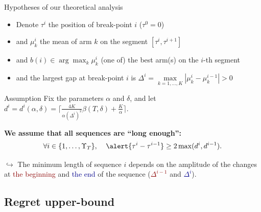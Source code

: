 \documentclass[11pt,french,ignorenonframetext,]{beamer}
\begin{document}
\begin{frame}{Hypotheses of our theoretical analysis}

  \begin{itemize}
    \item
    Denote $\tau^{i}$ the position of break-point $i$ ($\tau^0 = 0$)
    \item
    and $\mu_k^{i}$ the mean of arm $k$ on the segment $[\tau^i, \tau^{i+1}]$
    \item
    and $b(i) \in \arg\max_k \mu_k^{i}$ (one of) the best arm(s) on the $i$-th segment
    \item
    and the largest gap at break-point $i$ is
    $\Delta^{i} = \max\limits_{k=1,\dots,K} |\mu_k^{i} - \mu_k^{i-1}| >0$
  \end{itemize}

  \pause
  \begin{block}{Assumption}
    Fix the parameters $\alpha$ and $\delta$,
    and let $d^{i} = d^{i}(\alpha,\delta) = \lceil \frac{4K}{\alpha(\Delta^{i})^2}\beta(T,\delta) + \frac{K}{\alpha} \rceil$.

    \alert{\textbf{We assume that all sequences are ``long enough'':}}
    \vspace*{-5pt}
    \[ \forall i \in \{1,\dots,\Upsilon_T\}, \;\;\;\; \alert{\tau^{i} - \tau^{i-1}} \geq 2\max( d^{i}, d^{i-1} ). \]
  \end{block}

  \pause
  $\hookrightarrow$
  The \alert{minimum length of sequence $i$} depends on the amplitude of the changes at \textcolor{darkred}{the beginning} and \textcolor{darkblue}{the end} of the sequence (\textcolor{darkred}{$\Delta^{i-1}$} and \textcolor{darkblue}{$\Delta^{i}$}).

\end{frame}


\subsection{\hfill{}Regret upper-bound\hfill{}}
\end{document}
